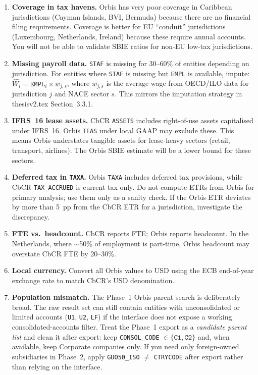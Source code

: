 \documentclass[11pt,a4paper]{article}
\newcommand{\field}[1]{\texttt{#1}}
\newcommand{\menu}[1]{\textsf{#1}}
\begin{document}
\begin{enumerate}
  \item \textbf{Coverage in tax havens.} Orbis has very poor coverage in Caribbean jurisdictions (Cayman Islands, BVI, Bermuda) because there are no financial filing requirements. Coverage is better for EU ``conduit'' jurisdictions (Luxembourg, Netherlands, Ireland) because these require annual accounts. You will not be able to validate SBIE ratios for non-EU low-tax jurisdictions.

  \item \textbf{Missing payroll data.} \field{STAF} is missing for 30--60\% of entities depending on jurisdiction. For entities where \field{STAF} is missing but \field{EMPL} is available, impute: $\hat{W}_i = \field{EMPL}_i \times \bar{w}_{j,s}$, where $\bar{w}_{j,s}$ is the average wage from OECD/ILO data for jurisdiction $j$ and NACE sector $s$. This mirrors the imputation strategy in thesisv2.tex Section~3.3.1.

  \item \textbf{IFRS~16 lease assets.} CbCR \field{ASSETS} includes right-of-use assets capitalised under IFRS~16. Orbis \field{TFAS} under local GAAP may exclude these. This means Orbis understates tangible assets for lease-heavy sectors (retail, transport, airlines). The Orbis SBIE estimate will be a lower bound for these sectors.

  \item \textbf{Deferred tax in \field{TAXA}.} Orbis \field{TAXA} includes deferred tax provisions, while CbCR \field{TAX\_ACCRUED} is current tax only. Do not compute ETRs from Orbis for primary analysis; use them only as a sanity check. If the Orbis ETR deviates by more than 5~pp from the CbCR ETR for a jurisdiction, investigate the discrepancy.

  \item \textbf{FTE vs.\ headcount.} CbCR reports FTE; Orbis reports headcount. In the Netherlands, where $\sim$50\% of employment is part-time, Orbis headcount may overstate CbCR FTE by 20--30\%.

  \item \textbf{Local currency.} Convert all Orbis values to USD using the ECB end-of-year exchange rate to match CbCR's USD denomination.

  \item \textbf{Population mismatch.} The Phase~1 Orbis parent search is deliberately broad. The raw result set can still contain entities with unconsolidated or limited accounts (\field{U1}, \field{U2}, \field{LF}) if the interface does not expose a working consolidated-accounts filter. Treat the Phase~1 export as a \emph{candidate parent list} and clean it after export: keep \field{CONSOL\_CODE} $\in \{\field{C1}, \field{C2}\}$ and, when available, keep \menu{Corporate companies} only. If you need only foreign-owned subsidiaries in Phase~2, apply \field{GUO50\_ISO} $\neq$ \field{CTRYCODE} after export rather than relying on the interface.
\end{enumerate}
\end{document}
